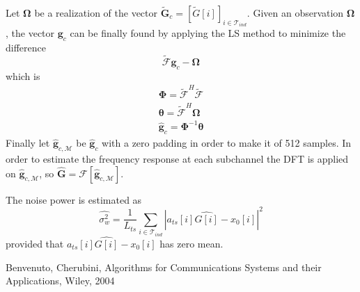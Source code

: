 \documentclass[10pt]{article}
\newcommand{\ofdM} {\mathcal{M}}
\begin{document}
Let $\boldsymbol{\Omega}$ be a realization of the vector $\tilde{\mathbf{G}}_c = [ \tilde{G}[i] ]_{i\in \mathcal{T}_{ind}}$. Given an observation $\boldsymbol{\Omega}$, the vector $\mathbf{g}_{c}$ can be finally found by applying the LS method to minimize the difference
\begin{equation}
	\boldsymbol{\tilde{\mathcal{F}}}\mathbf{g}_{c} - \boldsymbol{\Omega}
\end{equation}
which is
\begin{eqnarray}
	\boldsymbol{\Phi} = \boldsymbol{\tilde{\mathcal{F}}}^H \boldsymbol{\tilde{\mathcal{F}}} \\
	\boldsymbol{\theta} = \boldsymbol{\tilde{\mathcal{F}}}^H \boldsymbol{\Omega} \\ 
	\hat{\mathbf{g}}_{c} = \boldsymbol{\Phi}^{-1} \boldsymbol{\theta} 
\end{eqnarray}
Finally let $\hat{\mathbf{g}}_{c, \ofdM}$ be $\hat{\mathbf{g}}_{c}$ with a zero padding in order to make it of 512 samples. In order to estimate the frequency response at each subchannel the DFT is applied on $\hat{\mathbf{g}}_{c, \ofdM}$, so $\hat{\mathbf{G}} = \mathcal{F}[\hat{\mathbf{g}}_{c, \ofdM}]$. 

The noise power is estimated as 
\begin{equation}
	\hat{\sigma_w^2} = \frac{1}{L_{ts}} \sum_{i \in \mathcal{T}_{ind}} |a_{ts}[i]\hat{G[i]} - x_0[i]|^2
\end{equation}
provided that $a_{ts}[i]\hat{G[i]} - x_0[i]$ has zero mean.

\begin{thebibliography}{10}

Benvenuto, Cherubini, Algorithms for Communications Systems and their Applications, Wiley, 2004

\end{thebibliography}
\end{document}
